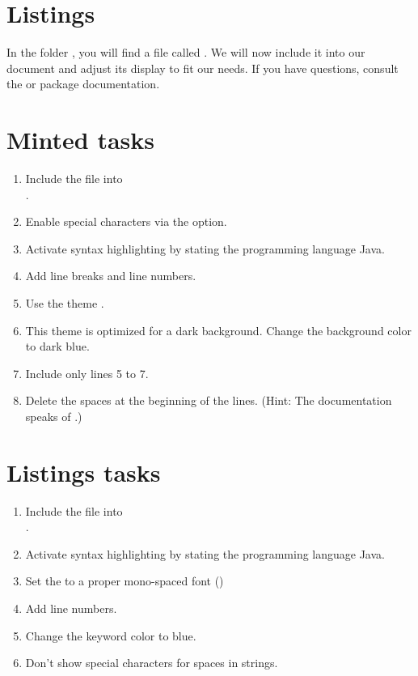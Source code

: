 \section{Listings}

In the folder , you will find a file called .
We will now include it into our document and adjust its display to fit our needs.
If you have questions, consult the  or  package documentation.

\section*{Minted tasks}

\begin{enumerate}
  \item Include the file into \\
  .
  \item Enable special characters via the  option.
  \item Activate syntax highlighting by stating the programming language Java.
  \item Add line breaks and line numbers.
  \item Use the theme .
  \item This theme is optimized for a dark background. Change the background color to dark blue.
  \item Include only lines 5 to 7.
  \item Delete the spaces at the beginning of the lines. (Hint: The documentation speaks of .)
\end{enumerate}

\section*{Listings tasks}

\begin{enumerate}
  \item Include the file into \\
  .
  \item Activate syntax highlighting by stating the programming language Java.
  \item Set the  to a proper mono-spaced font ()
  \item Add line numbers.
  \item Change the keyword color to blue.
  \item Don't show special characters for spaces in strings.
\end{enumerate}

